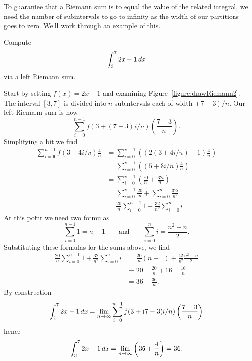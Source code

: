 To guarantee that a Riemann sum is to equal the value of the related
integral, we need the number of subintervals to go to infinity as the
width of our partitions goes to zero. We'll work through an example of
this.

\begin{example}
Compute
\[
\int_3^7 2x-1\, d x
\]
via a left Riemann sum.
\end{example}

\begin{solution}
Start by setting $f(x) = 2x-1$ and examining
Figure~\ref{figure:drawRiemann2}.  The interval $[3,7]$ is divided
into $n$ subintervals each of width $(7-3)/n$. Our left Riemann sum is
now
\[
\sum_{i=0}^{n-1} f(3+(7-3)i/n) \left(\frac{7-3}{n}\right).
\]
Simplifying a bit we find
\begin{align*}
\sum_{i=0}^{n-1} f(3+4i/n) \frac{4}{n} &= \sum_{i=0}^{n-1} \left((2(3+4i/n) -1 )\frac{4}{n}\right)\\
&= \sum_{i=0}^{n-1} \left((5+8i/n )\frac{4}{n}\right)\\
&= \sum_{i=0}^{n-1} \left(\frac{20}{n} + \frac{32i}{n^2}\right)\\
&= \sum_{i=0}^{n-1} \frac{20}{n} + \sum_{i=0}^n\frac{32i}{n^2}\\
&= \frac{20}{n}\sum_{i=0}^{n-1} 1 +\frac{32}{n^2} \sum_{i=0}^n i
\end{align*}
At this point we need two formulas
\[
\sum_{i=0}^{n-1}1 = n-1 \qquad\text{and}\qquad \sum_{i=0}^n i = \frac{n^2-n}{2}.
\]
Substituting these formulas for the sums above, we find 
\begin{align*}
\frac{20}{n}\sum_{i=0}^{n-1} 1 +\frac{32}{n^2} \sum_{i=0}^n i &=\frac{20}{n}(n-1) +\frac{32}{n^2}\frac{n^2-n}{2}\\
&=20 -\frac{20}{n}+16 -\frac{16}{n}\\
&=36 + \frac{36}{n}.
\end{align*}
By construction
\[
\int_3^7 2x-1 \, d x = \lim_{n\to \infty}\sum_{i=0}^{n-1} f(3+(7-3)i/n) \left(\frac{7-3}{n}\right)
\]
hence
\[
\int_3^7 2x-1 \, d x = \lim_{n\to \infty} \left(36 + \frac{4}{n}\right) = 36.
\]
\end{solution}


